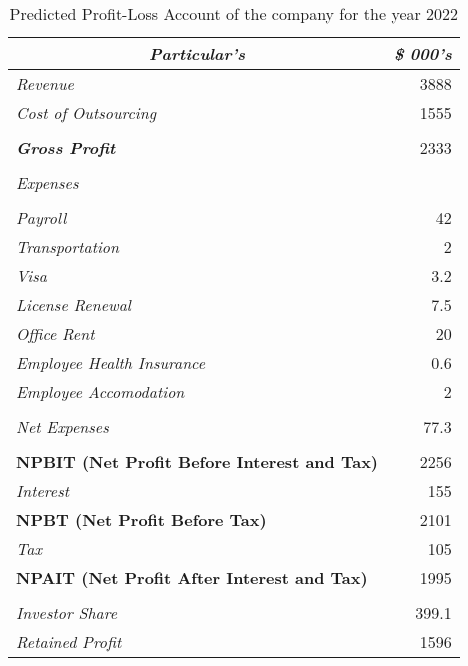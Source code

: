 \begin{table}[htbp]
  \centering
  \caption{Predicted Profit-Loss Account of the company for the year 2022}
    \begin{tabular}{|l|r|}
    \hline
    \hline
    \toprule
    \multicolumn{1}{|c|}{\textit{\textbf{Particular's}}} & \multicolumn{1}{c|}{\textit{\textbf{\$ 000's}}} \\
    \hline
    \hline
    \midrule
    \textit{Revenue} & 3888 \\
    \midrule
    \textit{Cost of Outsourcing} & 1555 \\
    \midrule
          &  \\
    \midrule
    \textit{\textbf{Gross Profit}} & 2333 \\
    \midrule
          &  \\
    \midrule
    \textit{Expenses} &  \\
    \midrule
          &  \\
    \midrule
    \textit{Payroll} & 42 \\
    \midrule
    \textit{Transportation} & 2 \\
    \midrule
    \textit{Visa} & 3.2 \\
    \midrule
    \textit{License Renewal} & 7.5 \\
    \midrule
    \textit{Office Rent} & 20 \\
    \midrule
    \textit{Employee Health Insurance} & 0.6 \\
    \midrule
    \textit{Employee Accomodation} & 2 \\
    \midrule
          &  \\
    \midrule
    \textit{Net Expenses} & 77.3 \\
    \midrule
          &  \\
    \midrule
    \textbf{NPBIT (Net Profit Before Interest and Tax)} & 2256 \\
    \midrule
    \textit{Interest} & 155 \\
    \midrule
    \textbf{NPBT (Net Profit Before Tax)} & 2101 \\
    \midrule
    \textit{Tax} & 105 \\
    \midrule
    \textbf{NPAIT (Net Profit After Interest and Tax)} & 1995 \\
    \midrule
          &  \\
    \midrule
    \textit{Investor Share} & 399.1 \\
    \midrule
    \textit{Retained Profit} & 1596 \\
    \bottomrule
    \hline
    \hline
    \end{tabular}%
  \label{tab:addlabel}%
\end{table}%

